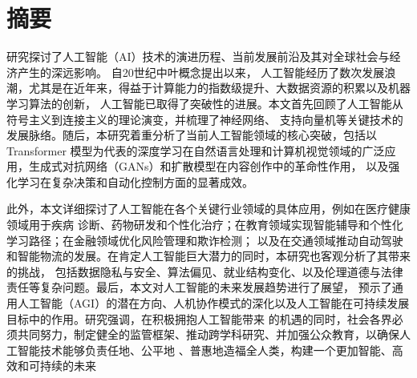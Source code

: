 \section*{摘要}
研究探讨了人工智能（AI）\cite{casal2023ai}技术的演进历程、当前发展前沿及其对全球社会与经济产生的深远影响。
自20世纪中叶概念提出以来，
人工智能经历了数次发展浪潮，尤其是在近年来，得益于计算能力的指数级提升、大数据资源的积累以及机器学习算法的创新，
人工智能已取得了突破性的进展。本文首先回顾了人工智能从符号主义到连接主义的理论演变，并梳理了神经网络、
支持向量机等关键技术的发展脉络。随后，本研究着重分析了当前人工智能领域的核心突破，包括以Transformer
模型为代表的深度学习在自然语言处理和计算机视觉领域的广泛应用，生成式对抗网络（GANs）和扩散模型在内容创作中的革命性作用，
以及强化学习在复杂决策和自动化控制方面的显著成效。

此外，本文详细探讨了人工智能在各个关键行业领域的具体应用，例如在医疗健康领域用于疾病
诊断、药物研发和个性化治疗；在教育领域实现智能辅导和个性化学习路径；在金融领域优化风险管理和欺诈检测；
以及在交通领域推动自动驾驶和智能物流的发展。在肯定人工智能巨大潜力的同时，本研究也客观分析了其带来的挑战，
包括数据隐私与安全、算法偏见、就业结构变化、以及伦理道德与法律责任等复杂问题。最后，本文对人工智能的未来发展趋势进行了展望，
预示了通用人工智能（AGI）的潜在方向、人机协作模式的深化以及人工智能在可持续发展目标中的作用。研究强调，在积极拥抱人工智能带来
的机遇的同时，社会各界必须共同努力，制定健全的监管框架、推动跨学科研究、并加强公众教育，以确保人工智能技术能够负责任地、公平地
、普惠地造福全人类，构建一个更加智能、高效和可持续的未来 